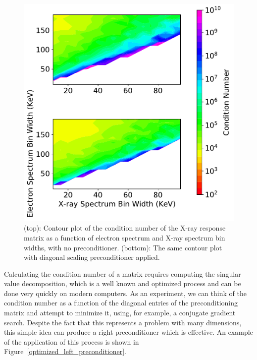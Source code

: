 \begin{figure}[p]
    \centering
    \includegraphics[width=.8\textwidth]{figures/chapter_4/condition_number_binning_diagonal_scaling/fig.pdf}
    \caption{(top): Contour plot of the condition number of the X-ray response matrix as a function of electron spectrum and X-ray spectrum bin widths, with no preconditioner. (bottom): The same contour plot with diagonal scaling preconditioner applied.}
    \label{matrix_spectral_plot_diagonal_scaling}
\end{figure}

Calculating the condition number of a matrix requires computing the singular value decomposition, which is a well known and optimized process and can be done very quickly on modern computers. As an experiment, we can think of the condition number as a function of the diagonal entries of the preconditioning matrix and attempt to minimize it, using, for example, a conjugate gradient search. Despite the fact that this represents a problem with many dimensions, this simple idea can produce a right preconditioner which is effective. An example of the application of this process is shown in Figure~\ref{optimized_left_preconditioner}.

